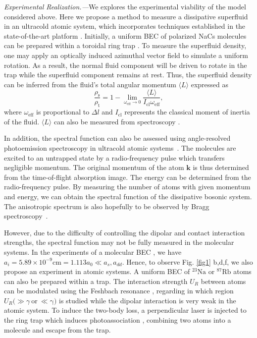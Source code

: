 \documentclass[aps,prl,twocolumn,superscriptaddress,]{revtex4-1}
\begin{document}
\emph{Experimental Realization.---}We explores the experimental viability of the model considered above. Here we propose a method to measure a dissipative superfluid in an ultracold atomic system, which incorporates techniques established in the state-of-the-art platform \citep{PhysRevLett.104.030401}. Initially, a uniform BEC of polarized NaCs molecules can be prepared within a toroidal ring trap \citep{PhysRevLett.104.030401,PhysRevLett.110.025302}. To measure the superfluid density, one may apply an optically induced azimuthal vector field to simulate a uniform rotation. As a result, the normal fluid component will be driven to rotate in the trap while the superfluid component remains at rest. Thus, the superfluid density can be inferred from the fluid's total angular momentum $\langle L\rangle$ expressed as \cite{PhysRevLett.104.030401}
\begin{equation}
	\frac{\rho_{\mathrm{s}}}{\rho_{\mathrm{t}}}=1-\lim_{\omega_{\mathrm{eff}}\to0}\frac{\langle L\rangle}{I_{\mathrm{cl}}\omega_{\mathrm{eff}}},
\end{equation}
where $\omega_{\mathrm{eff}}$ is proportional to $\Delta l$ and $I_{\mathrm{cl}}$ represents the classical moment of inertia of the fluid. $\langle L\rangle$ can also be measured from spectroscopy \cite{PhysRevLett.104.030401}.

In addition, the spectral function can also be assessed using angle-resolved
photoemission spectroscopy in ultracold atomic systems~\citep{Brown2020,PhysRevB.97.125117}. The molecules are excited to an untrapped state by a radio-frequency pulse which transfers negligible momentum. The original momentum of the atom $\bm{k}$ is thus determined from the time-of-flight absorption image. The energy can be determined from the radio-frequency pulse. By measuring the number of atoms with given momentum and energy, we can obtain the spectral function of the dissipative bosonic system. The anisotropic spectrum is also hopefully to be observed by Bragg spectroscopy~\cite{Bismut2012}.

However, due to the difficulty of controlling the dipolar and contact interaction strengths, the spectral function may not be fully measured in the molecular systems. In the experiments of a molecular BEC \cite{Bigagli2023}, we have $a_i=5.89\times10^{-9}\text{cm}=1.113a_0\ll a_{s},a_{dd}$. Hence, to observe Fig. \ref{fig1} b,d,f, we also propose an experiment in atomic systems. A uniform BEC of ${}^{23}\text{Na}$ or ${}^{87}\text{Rb}$ atoms can also be prepared within a trap. The interaction strength $U_{R}$ between atoms can be modulated using the Feshbach resonance \citep{Donley2002,PhysRevLett.115.265302,Inouye1998,RevModPhys.82.1225,Winkler2006},
regarding in which region $U_{R}(\gg\gamma\ \mathrm{or\ \ll\gamma)}$
is studied while the dipolar interaction is very weak in the atomic system. To induce the two-body loss, a perpendicular laser is
injected to the ring trap which induces photoassociation \citep{PhysRevLett.88.120403,doi:10.1126/sciadv.1701513,PhysRevLett.101.060406,PhysRevLett.121.073202,PhysRevLett.130.063001}, combining two atoms into a molecule and escape from the trap.
\end{document}
